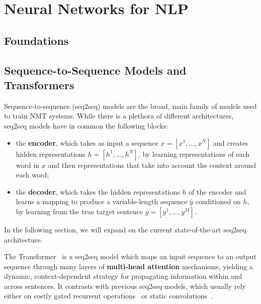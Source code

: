 \section{Neural Networks for NLP}
\label{sec:nmt}

\subsection{Foundations}

\subsection{Sequence-to-Sequence Models and Transformers}
\label{sec:transformer_bg}

Sequence-to-sequence (seq2seq) models are the broad, main family of models
used to train NMT systems. While there is a plethora of different architectures,
seq2seq models have in common the following blocks:

\begin{itemize}
    \item the {\bf encoder}, which takes as input a sequence $x=[x^1,
              \dots, x^N]$ and creates hidden representations $h=[h^1, \dots,
              h^N]$, by learning representations of each word in $x$ and then
          representations that take into account the context around each word;
    \item the {\bf decoder}, which takes the hidden representations
          $h$ of the encoder and learns a mapping to produce a
          variable-length sequence $\hat{y}$ conditioned on $h$, by
          learning from the true target sentence $y=[y^1, \dots, y^M]$.
\end{itemize}

In the following section, we will expand on the current
state-of-the-art seq2seq architecture.

The Transformer~\citep{vaswani2017attention} is a
seq2seq model which maps an input sequence to
an output sequence through many layers of \textbf{multi-head
    attention} mechanisms, yielding a dynamic, context-dependent strategy
for propagating information within and across sentences. It contrasts
with previous seq2seq models, which usually rely either on costly
gated recurrent operations~\citep[often
    LSTMs:][]{bahdanau2014neural,luong2015effective} or static
convolutions~\citep{convseq}.

